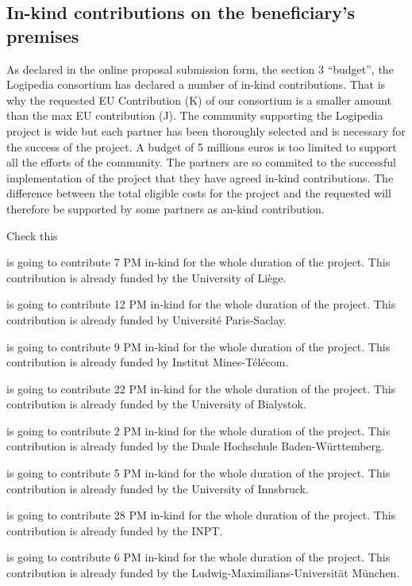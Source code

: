 \subsection*{In-kind contributions on the beneficiary’s premises}

As declared in the online proposal submission form, the section 3
``budget'', the Logipedia consortium has declared a number of in-kind
contributions. That is why the requested EU Contribution (K) of our
consortium is a smaller amount than the max EU contribution (J). The
community supporting the Logipedia project is wide but each partner
has been thoroughly selected and is necessary for the success of the
project.
A budget of 5 millions euros is too limited to support all
the efforts of the community.
The partners are so commited to the successful implementation of the
project that they have agreed in-kind contributions.
The difference between the total
eligible costs for the project and the requested will therefore be
supported by some partners as an-kind contribution.


{\color{red} Check this} 

 is going to contribute 7 PM in-kind for the whole duration of the project.
This contribution is already funded by the University of Liège.

 is going to contribute 12 PM in-kind for the whole duration of the project.
This contribution is already funded by Université Paris-Saclay.

 is going to contribute 9 PM in-kind for the whole duration of the project.
This contribution is already funded by Institut Mines-Télécom.

 is going to contribute 22 PM in-kind for the whole duration of the project.
This contribution is already funded by the University of Bialystok.

 is going to contribute 2 PM in-kind for the whole duration of the project.
This contribution is already funded by the Duale Hochschule Baden-Württemberg.

 is going to contribute 5 PM in-kind for the whole duration of the project.
This contribution is already funded by the University of Innsbruck.

 is going to contribute 28 PM in-kind for the whole duration of the project.
This contribution is already funded by the INPT.

 is going to contribute 6 PM in-kind for the whole duration of the project.
This contribution is already funded by the Ludwig-Maximilians-Universit\"at M\"unchen.


